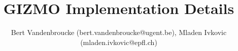 




\title{GIZMO Implementation Details}
\author{Bert Vandenbroucke (bert.vandenbroucke@ugent.be), Mladen Ivkovic (mladen.ivkovic@epfl.ch)}
\date{}







\newcommand{\Aij}{$\mathbf{A}_{ij}$}
\newcommand{\Aijm}{\mathbf{A}_{ij}}		%
\newcommand{\U}{\mathbf{U}}
\newcommand{\F}{\mathbf{F}}
\newcommand{\psitilde}{\tilde{\boldsymbol{\psi}}}






	



\maketitle




































